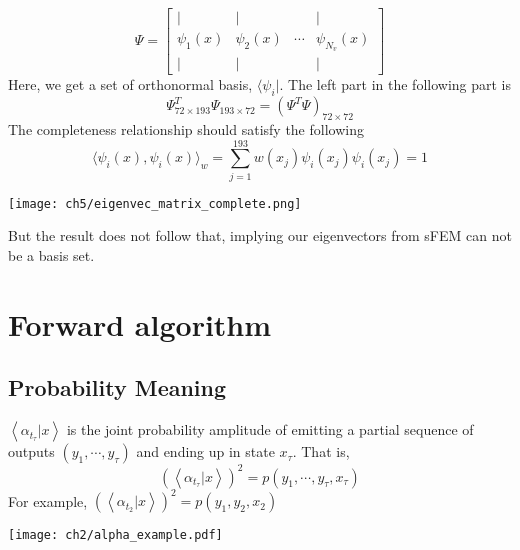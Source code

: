 \begin{definition}
\begin{equation}
\Psi=
\begin{bmatrix}
\vert & \vert &  & \vert \\
\psi_1(x) & \psi_2(x) & \cdots & \psi_{N_v}(x) \\
\vert & \vert &  & \vert 
\end{bmatrix}
\end{equation}
\label{eigenvectormatrix}
Here, we get a set of orthonormal basis, $\langle \psi_i |$. The left part in the following part is 
\begin{equation}
        \Psi^T_{72\times 193}\Psi_{193 \times 72} = (\Psi^T\Psi)_{72 \times 72}
\end{equation}
The completeness relationship should satisfy the following
\begin{equation}
        \langle \psi_i(x),\psi_i(x)\rangle _{w} = \sum_{j=1}^{193}w(x_j)\psi_i(x_j)\psi_i(x_j)  = 1
\end{equation}
\begin{center}
        \texttt{[image: ch5/eigenvec\_matrix\_complete.png]}   
\end{center}
But the result does not follow that, implying our eigenvectors from sFEM can not be a basis set.
\end{definition}

\section{Forward algorithm}
\subsection{Probability Meaning}
$ \left<\alpha_{t_{\tau}}|x \right>$ is the joint probability amplitude of emitting a partial sequence of outputs $(y_1,\cdots,y_{\tau})$ and ending up in state $x_{\tau}$. That is,
\begin{equation}
        (\left<\alpha_{t_{\tau}}|x \right>)^2 = p(y_1,\cdots,y_{\tau}, x_{\tau})
\end{equation}
For example, $(\left<\alpha_{t_2}|x \right>)^2 = p(y_1, y_2, x_2)$
\begin{center}
        \texttt{[image: ch2/alpha\_example.pdf]}
\end{center}
